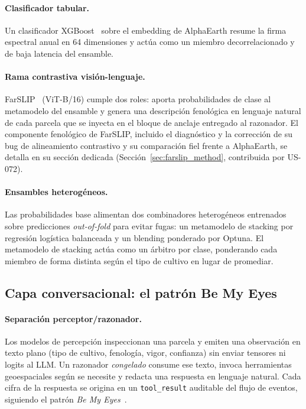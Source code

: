 \paragraph{Clasificador tabular.}
Un clasificador XGBoost~\cite{chen2016xgboost} sobre el embedding de
AlphaEarth resume la firma espectral anual en 64 dimensiones y actúa
como un miembro decorrelacionado y de baja latencia del ensamble.

\paragraph{Rama contrastiva visión-lenguaje.}
FarSLIP~\cite{li2025farslip} (ViT-B/16) cumple dos roles: aporta
probabilidades de clase al metamodelo del ensamble y genera una
descripción fenológica en lenguaje natural de cada parcela que se
inyecta en el bloque de anclaje entregado al razonador. El componente
fenológico de FarSLIP, incluido el diagnóstico y la corrección de su bug
de alineamiento contrastivo y su comparación fiel frente a AlphaEarth,
se detalla en su sección dedicada (Sección~\ref{sec:farslip_method},
contribuida por US-072).

\paragraph{Ensambles heterogéneos.}
Las probabilidades base alimentan dos combinadores heterogéneos
entrenados sobre predicciones \emph{out-of-fold} para evitar fugas: un
metamodelo de stacking por regresión logística balanceada y un blending
ponderado por Optuna. El metamodelo de stacking actúa como un árbitro
por clase, ponderando cada miembro de forma distinta según el tipo de
cultivo en lugar de promediar.

\subsection{Capa conversacional: el patrón Be My Eyes}
\label{sec:method-bemyeyes}

\paragraph{Separación perceptor/razonador.}
Los modelos de percepción inspeccionan una parcela y emiten una
observación en texto plano (tipo de cultivo, fenología, vigor,
confianza) sin enviar tensores ni logits al LLM. Un razonador
\emph{congelado} consume ese texto, invoca herramientas geoespaciales
según se necesite y redacta una respuesta en lenguaje natural. Cada
cifra de la respuesta se origina en un \texttt{tool\_result} auditable
del flujo de eventos, siguiendo el patrón \emph{Be My
Eyes}~\cite{huang2025bemyeyes}.

